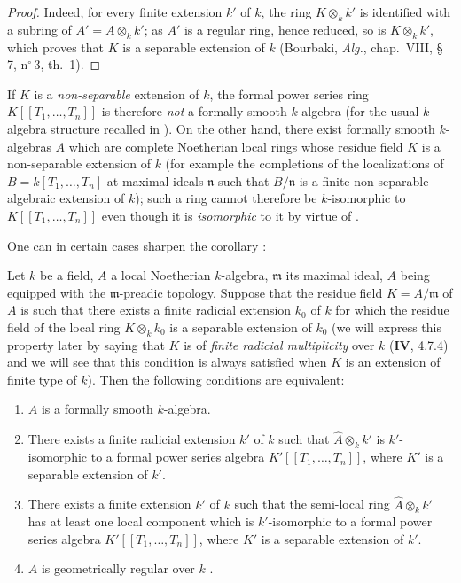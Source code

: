 \begin{proof}
Indeed, for every finite extension $k'$ of $k$, the ring $K\otimes_k k'$ is identified with a subring of $A'=A\otimes_k k'$;
as $A'$ is a regular ring, hence reduced, so is $K\otimes_k k'$, which proves that $K$ is a separable extension of $k$ (Bourbaki, \emph{Alg.}, chap.~VIII, \S\,7, n$^\circ$\,3, th.~1).
\end{proof}

\begin{remark}[19.6.5.2]
\label{0.19.6.5.2}
If $K$ is a \emph{non-separable} extension of $k$, the formal power series ring $K[[T_1,\ldots,T_n]]$ is therefore \emph{not} a formally smooth $k$-algebra (for the usual $k$-algebra structure recalled in ).
On the other hand, there exist formally smooth $k$-algebras $A$ which are complete Noetherian local rings whose residue field $K$ is a non-separable extension of $k$ (for example the completions of the localizations of $B=k[T_1,\ldots,T_n]$ at maximal ideals $\mathfrak{n}$ such that $B/\mathfrak{n}$ is a finite non-separable algebraic extension of $k$);
such a ring cannot therefore be $k$-isomorphic to $K[[T_1,\ldots,T_n]]$ even though it is \emph{isomorphic} to it by virtue of .

One can in certain cases sharpen the corollary :
\end{remark}

\begin{proposition}[19.6.6]
\label{0.19.6.6}
Let $k$ be a field, $A$ a local Noetherian $k$-algebra, $\mathfrak{m}$ its maximal ideal, $A$ being equipped with the $\mathfrak{m}$-preadic topology.
Suppose that the residue field $K=A/\mathfrak{m}$ of $A$ is such that there exists a finite radicial extension $k_0$ of $k$ for which the residue field of the local ring $K\otimes_k k_0$ is a separable extension of $k_0$ (we will express this property later by saying that $K$ is of \emph{finite radicial multiplicity} over $k$ ($\mathbf{IV}$, 4.7.4) and we will see that this condition is always satisfied when $K$ is an extension of finite type of $k$).
Then the following conditions are equivalent:
\begin{enumerate}
  \item[a)] $A$ is a formally smooth $k$-algebra.
  \item[b)] There exists a finite radicial extension $k'$ of $k$ such that $\widehat{A}\otimes_k k'$ is $k'$-isomorphic to a formal power series algebra $K'[[T_1,\ldots,T_n]]$, where $K'$ is a separable extension of $k'$.
  \item[b')] There exists a finite extension $k'$ of $k$ such that the semi-local ring $\widehat{A}\otimes_k k'$ has at least one local component which is $k'$-isomorphic to a formal power series algebra $K'[[T_1,\ldots,T_n]]$, where $K'$ is a separable extension of $k'$.
  \item[c)] $A$ is geometrically regular over $k$ .
\end{enumerate}
\end{proposition}


